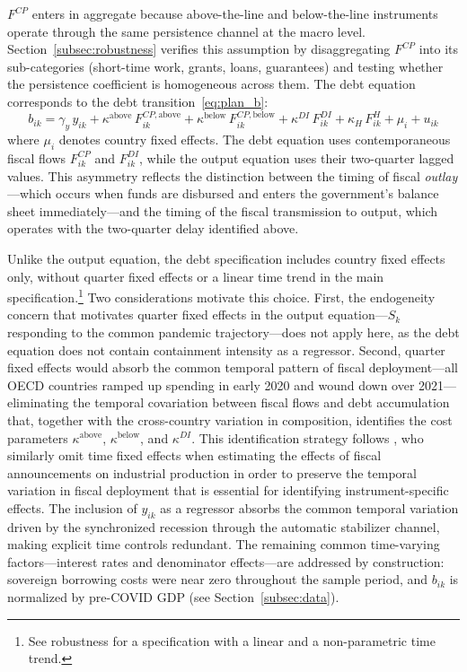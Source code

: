 \documentclass[12pt, a4paper]{article}
\begin{document}
$F^{CP}$ enters in aggregate because above-the-line and below-the-line instruments operate through the same persistence channel at the macro level. Section~\ref{subsec:robustness} verifies this assumption by disaggregating $F^{CP}$ into its sub-categories (short-time work, grants, loans, guarantees) and testing whether the persistence coefficient is homogeneous across them. The debt equation corresponds to the debt transition~\eqref{eq:plan_b}:
%
\begin{equation}
    b_{ik} = \gamma_y\, y_{ik}
    + \kappa^{\text{above}}\, F_{ik}^{CP,\text{above}}
    + \kappa^{\text{below}}\, F_{ik}^{CP,\text{below}}
    + \kappa^{DI}\, F_{ik}^{DI}
    + \kappa_H\, F_{ik}^{H}
    + \mu_i + u_{ik}
    \label{eq:debt_est}
\end{equation}
%
where $\mu_i$ denotes country fixed effects. The debt equation uses contemporaneous fiscal flows $F^{CP}_{ik}$ and $F^{DI}_{ik}$, while the output equation uses their two-quarter lagged values. This asymmetry reflects the distinction between the timing of fiscal \textit{outlay}---which occurs when funds are disbursed and enters the government's balance sheet immediately---and the timing of the fiscal transmission to output, which operates with the two-quarter delay identified above.

Unlike the output equation, the debt specification includes country fixed effects only, without quarter fixed effects or a linear time trend in the main specification.\footnote{See robustness for a specification with a linear and a non-parametric time trend.} Two considerations motivate this choice. First, the endogeneity concern that motivates quarter fixed effects in the output equation---$S_k$ responding to the common pandemic trajectory---does not apply here, as the debt equation does not contain containment intensity as a regressor. Second, quarter fixed effects would absorb the common temporal pattern of fiscal deployment---all OECD countries ramped up spending in early 2020 and wound down over 2021---eliminating the temporal covariation between fiscal flows and debt accumulation that, together with the cross-country variation in composition, identifies the cost parameters $\kappa^{\text{above}}$, $\kappa^{\text{below}}$, and $\kappa^{DI}$. This identification strategy follows \citet{deb2021}, who similarly omit time fixed effects when estimating the effects of fiscal announcements on industrial production in order to preserve the temporal variation in fiscal deployment that is essential for identifying instrument-specific effects. The inclusion of $y_{ik}$ as a regressor absorbs the common temporal variation driven by the synchronized recession through the automatic stabilizer channel, making explicit time controls redundant. The remaining common time-varying factors---interest rates and denominator effects---are addressed by construction: sovereign borrowing costs were near zero throughout the sample period, and $b_{ik}$ is normalized by pre-COVID GDP (see Section~\ref{subsec:data}).
\end{document}
